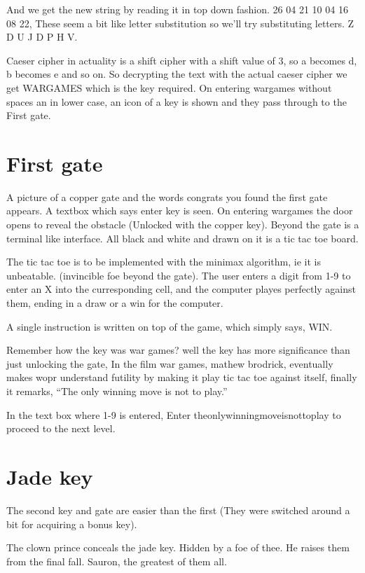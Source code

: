 \documentclass[12pt]{article}
\begin{document}
And we get the new string by reading it in top down fashion. 26 04 21 10 04 16 08 22, These seem a bit like letter substitution so we'll try substituting letters. Z D U J D P H V. 

Caeser cipher in actuality is a shift cipher with a shift value of 3, so a becomes d, b becomes e and so on. So decrypting the text with the actual caeser cipher we get WARGAMES which is the key required. On entering wargames without spaces an in lower case, an icon of a key is shown and they pass through to the First gate.

\section{First gate}
A picture of a copper gate and the words congrats you found the first gate appears. A textbox which says enter key is seen. On entering wargames the door opens to reveal the obstacle
 (Unlocked with the copper key). Beyond the gate is a terminal like interface. All black and white and drawn on it is a tic tac toe board.

The tic tac toe is to be implemented with the minimax algorithm, ie it is unbeatable. (invincible foe beyond the gate). The user enters a digit from 1-9 to enter an X into the curresponding cell, and the computer playes perfectly against them, ending in a draw or a win for the computer. 

A single instruction is written on top of the game, which simply says, WIN.

Remember how the key was war games? well the key has more significance than just unlocking the gate, In the film war games, mathew brodrick, eventually makes wopr understand futility by making it play tic tac toe against itself, finally it remarks, ``The only winning move is not to play.''

In the text box where 1-9 is entered, Enter theonlywinningmoveisnottoplay to proceed to the next level.


\section{Jade key}

The second key and gate are easier than the first (They were switched around a bit for acquiring a bonus key).

\begin{centering}
The clown prince conceals the jade key.
Hidden by a foe of thee.
He raises them from the final fall.
Sauron, the greatest of them all.
\end{centering}
\end{document}
